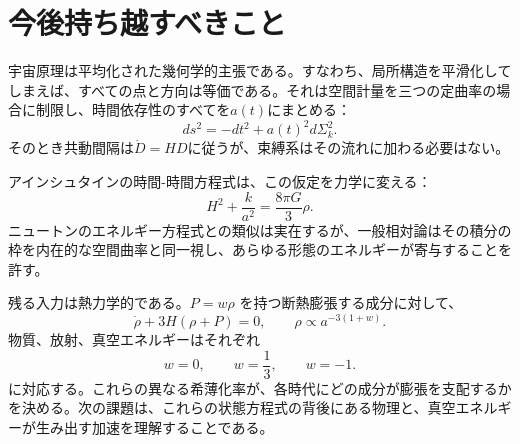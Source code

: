 \begin{classroomqa}
\end{classroomqa}

\section{今後持ち越すべきこと}

宇宙原理は平均化された幾何学的主張である。すなわち、局所構造を平滑化してしまえば、すべての点と方向は等価である。それは空間計量を三つの定曲率の場合に制限し、時間依存性のすべてを\(a(t)\)にまとめる：
\begin{equation}
ds^2=-dt^2+a(t)^2d\Sigma_k^2.
\end{equation}
そのとき共動間隔は\(\dot D=HD\)に従うが、束縛系はその流れに加わる必要はない。

アインシュタインの時間-時間方程式は、この仮定を力学に変える：
\begin{equation}
H^2+\frac{k}{a^2}=\frac{8\pi G}{3}\rho.
\end{equation}
ニュートンのエネルギー方程式との類似は実在するが、一般相対論はその積分の枠を内在的な空間曲率と同一視し、あらゆる形態のエネルギーが寄与することを許す。

残る入力は熱力学的である。\(P=w\rho\) を持つ断熱膨張する成分に対して、
\begin{equation}
\dot\rho+3H(\rho+P)=0,
\qquad
\rho\propto a^{-3(1+w)}.
\end{equation}
物質、放射、真空エネルギーはそれぞれ
\begin{equation}
w=0,\qquad w=\frac13,\qquad w=-1.
\end{equation}
に対応する。これらの異なる希薄化率が、各時代にどの成分が膨張を支配するかを決める。次の課題は、これらの状態方程式の背後にある物理と、真空エネルギーが生み出す加速を理解することである。